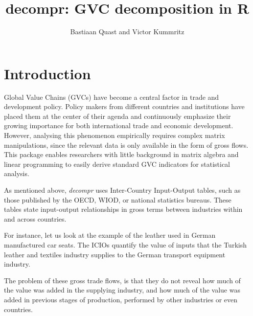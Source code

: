 \documentclass{article}\usepackage[]{graphicx}\usepackage[]{color}
\title{decompr: GVC decomposition in R}
\author{Bastiaan Quast and Victor Kummritz}
\begin{document}
\maketitle

\pagebreak

\section{Introduction}
Global Value Chains (GVCs) have become a central factor in trade and development policy.
Policy makers from different countries and institutions have placed them at the center of their agenda
and continuously emphasize their growing importance for both international trade and economic development.
However, analysing this phenomenon empirically requires complex matrix manipulations,
since the relevant data is only available in the form of gross flows.
This package enables researchers with little background in matrix algebra and linear programming
to easily derive standard GVC indicators for statistical analysis.

As mentioned above, \textit{decompr} uses Inter-Country Input-Output tables,
such as those published by the OECD, WIOD, or national statistics bureaus.
These tables state input-output relationships in gross terms
between industries within and across countries.

For instance, let us look at the example of the leather used in German manufactured car seats.
The ICIOs quantify the value of inputs that the Turkish leather and textiles industry
supplies to the German transport equipment industry.

The problem of these gross trade flows,
is that they do not reveal how much of the value was added in the supplying industry,
and how much of the value was added in previous stages of production,
performed by other industries or even countries.
\end{document}
